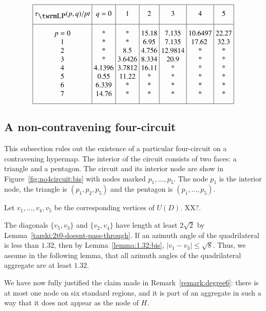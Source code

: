 \begin{equation}
\vbox{\offinterlineskip \hrule
\halign{&\vrule#&\strut\ \hfil#\hfil\ \cr   %
height 7pt&\omit&&\omit&&\omit&&\omit&&\omit&&\omit&&\omit&\cr
&\hfil $\tlp(p,q)/\pt$\hfil
        &&\hfil $q=0$\hfil
        &&\hfil1\hfil
        &&\hfil2\hfil
        &&\hfil3\hfil
        &&\hfil4\hfil
        &&\hfil5\hfil&
\cr height 7pt&\omit&&\omit&&\omit&&\omit&&\omit&&\omit&&\omit&\cr
\noalign{\hrule}
height7pt&\omit&&\omit&&\omit&&\omit&&\omit&&\omit&&\omit&\cr
&$p=0$&& *&& *&& 15.18&& 7.135&& 10.6497&& 22.27&\cr &1&&    *&& *&&
6.95&& 7.135&&17.62  && 32.3&\cr &2&&    *&&
8.5&&4.756&&12.9814&&*&&*&\cr &3&& *&& 3.6426&&8.334&&20.9&&*&&*&\cr
&4&&4.1396&&3.7812&&16.11&&*&&*&&*&\cr
&5&&0.55&&11.22&&*&&*&&*&&*&\cr &6&&6.339&&*&&*&&*&&*&&*&\cr
&7&&14.76&&*&&*&&*&&*&&*&\cr
height7pt&\omit&&\omit&&\omit&&\omit&&\omit&&\omit&&\omit&\cr}
\hrule }
    \label{eqn:old5.1:bis}
\end{equation}



\subsection{A non-contravening four-circuit}
\label{sec:impossible-circuit}

This subsection rules out the existence of a particular four-circuit
on a contravening hypermap.  The interior of the circuit consists of
two faces: a triangle and a pentagon.  The circuit and its interior
node are show in Figure~\ref{fig:no4circuit:bis} with nodes marked
$p_1,\ldots,p_5$. The node $p_1$ is the interior node, the triangle
is $(p_1,p_2,p_5)$ and the pentagon is $(p_1,\ldots,p_5)$.


Let $v_1,\ldots,v_4,v_5$ be the corresponding vertices of $U(D)$.
XX?.

The diagonals $\{v_5,v_3\}$ and $\{v_2,v_4\}$ have length at least
$2\sqrt2$ by Lemma~\ref{tarski:2t0-doesnt-pass-through}.  If an
azimuth angle of the  quadrilateral is less than $1.32$, then by
Lemma~\ref{lemma:1.32:bis},  $|v_1-v_3|\le\sqrt{8}$.  Thus, we
assume in the following lemma, that all azimuth angles of the
quadrilateral aggregate are at least $1.32$.


\begin{remark}
We have now fully justified the claim made in
Remark~\ref{remark:degree6}: there is at most one node on six
standard regions, and it is part of an aggregate in such a way that
it does not appear as the node of $H$.
\end{remark}


